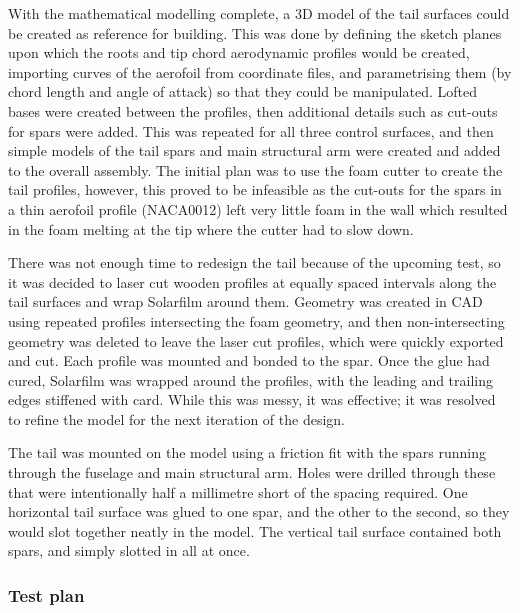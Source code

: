 \documentclass[../../main.tex]{subfiles}
\begin{document}
With the mathematical modelling complete, a 3D model of the tail surfaces could be created as reference for building.
This was done by defining the sketch planes upon which the roots and tip chord aerodynamic profiles would be created, importing curves of the aerofoil from coordinate files, and parametrising them (by chord length and angle of attack) so that they could be manipulated.
Lofted bases were created between the profiles, then additional details such as cut-outs for spars were added.
This was repeated for all three control surfaces, and then simple models of the tail spars and main structural arm were created and added to the overall assembly. 
The initial plan was to use the foam cutter to create the tail profiles, however, this proved to be infeasible as the cut-outs for the spars in a thin aerofoil profile (NACA0012) left very little foam in the wall which resulted in the foam melting at the tip where the cutter had to slow down.  

There was not enough time to redesign the tail because of the upcoming test, so it was decided to laser cut wooden profiles at equally spaced intervals along the tail surfaces and wrap Solarfilm around them.
Geometry was created in CAD using repeated  profiles intersecting the foam geometry, and then non-intersecting geometry was deleted to leave the laser cut profiles, which were quickly exported and cut.
Each profile was mounted and bonded to the spar.
Once the glue had cured, Solarfilm was wrapped around the profiles, with the leading and trailing edges stiffened with card.
While this was messy, it was effective; it was resolved to refine the model for the next iteration of the design.  

The tail was mounted on the model using a friction fit with the spars running through the fuselage and main structural arm.
Holes were drilled through these that were intentionally half a millimetre short of the spacing required.
One horizontal tail surface was glued to one spar, and the other to the second, so they would slot together neatly in the model.
The vertical tail surface contained both spars, and simply slotted in all at once. 


\subsubsection{Test plan} \label{sec:design-process:interim-design-review:wind-tunnel-test:test-plan}
\end{document}

